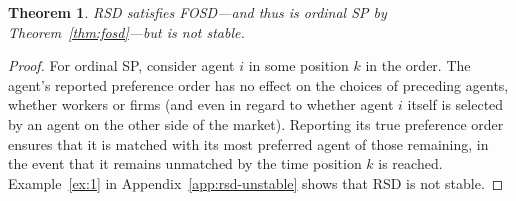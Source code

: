 \documentclass[11pt,letterpaper]{article}
\newtheorem{theorem}{Theorem}
\theoremstyle{definition}
\newtheorem{example}[theorem]{Example}
\newcommand{\kibitz}[2]{\ifnum\Comments=1{\color{#1}{#2}}\fi}
\newcommand{\zf}[1]{\kibitz{blue}{[ZF: #1]}}
\newcommand{\dcp}[1]{\kibitz{orange}{[DCP: #1]}}
\newcommand{\todo}[1]{\kibitz{blue}{[TODO: #1]}}
\begin{document}
\begin{theorem}
RSD satisfies FOSD---and thus is ordinal SP by Theorem~\ref{thm:fosd}---but is not stable. 
\end{theorem}
\begin{proof}
For ordinal SP, 
consider agent  $i$ in some position $k$ in the order. The agent's reported preference order has no effect on the choices of preceding agents, whether workers or firms (and even in regard to whether agent $i$ itself is selected by an agent on the other side of the market). Reporting its true preference order ensures that it is matched with 
its most preferred agent of those remaining, in the event that it remains unmatched by the time position $k$ is reached. %
Example~\ref{ex:1} in Appendix~\ref{app:rsd-unstable} shows that RSD is not stable.
\end{proof}

\end{document}
